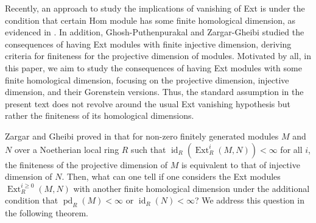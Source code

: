 \documentclass[11pt, a4paper,pagebackref]{amsart}
\numberwithin{equation}{section}
\theoremstyle{definition}
\newtheorem{remark and definition}[theorem]{Remark and Definition}
\newtheorem{remark and notation}[theorem]{Remark and Notation}
\newcommand\Ext{\operatorname{Ext}}
\begin{document}
Recently, an approach to study the implications of vanishing of Ext is under the condition that certain Hom module has some finite homological dimension, as evidenced in \cite{HomologicalDimensionsTheGorensteinPropertyAndSpecialCasesOfSomeConjectures, injectivedimensiontakahashi, OnModulesWhoseDualIsOfFiniteGorensteinDimension}. In addition, Ghosh-Puthenpurakal \cite{GorensteinringsviahomologicaldimensionsandsymmetryinvanishingofExtandTatecohomology} and  Zargar-Gheibi \cite{NumericalApectsofComplexesOfFiniteHomologicalDimensions} studied the consequences of having Ext modules with finite injective dimension, deriving criteria for finiteness for the projective dimension of modules. Motivated by all, in this paper, we aim to study the consequences of having Ext modules with some finite homological dimension, focusing on the projective dimension, injective dimension, and their Gorenstein versions. Thus, the standard assumption in the present text does not revolve around the usual Ext vanishing hypothesis but rather the finiteness of its homological dimensions. 

Zargar and Gheibi proved in \cite{NumericalApectsofComplexesOfFiniteHomologicalDimensions} that for non-zero finitely generated modules $M$ and $N$ over a Noetherian local ring $R$ such that $\operatorname{id}_R(\Ext_R^i(M,N))<\infty$ for all $i$, the finiteness of the projective dimension of $M$ is equivalent to that of injective dimension of $N$. Then, what can one tell if one considers the Ext modules $\Ext_R^{i\geq 0}(M,N)$ with another finite homological dimension under the additional condition that $\operatorname{pd}_R(M)<\infty$ or $\operatorname{id}_R(N)<\infty$? We address this question in the following theorem.
\end{document}
